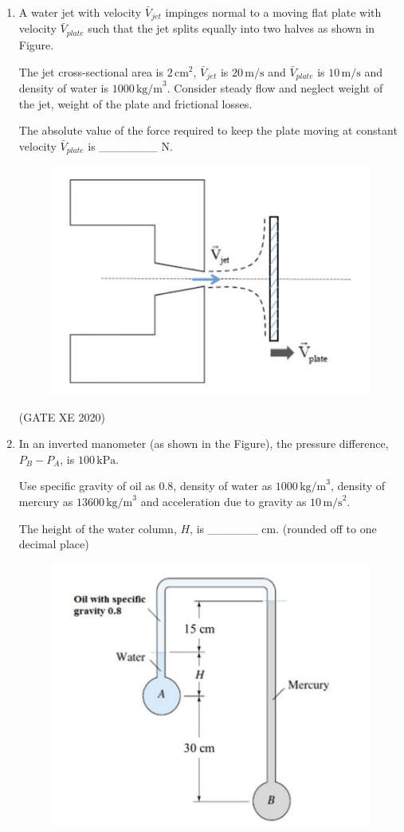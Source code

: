 \documentclass[12pt]{article}
\begin{document}
\begin{enumerate}
\item A water jet with velocity $\bar{V}_{jet}$ impinges normal to a moving flat plate with velocity $\bar{V}_{plate}$ such that the jet splits equally into two halves as shown in Figure.  

The jet cross-sectional area is $2 \,\text{cm}^2$, $\bar{V}_{jet}$ is $20 \,\text{m/s}$ and $\bar{V}_{plate}$ is $10 \,\text{m/s}$ and density of water is $1000 \,\text{kg/m}^3$. Consider steady flow and neglect weight of the jet, weight of the plate and frictional losses.  

The absolute value of the force required to keep the plate moving at constant velocity $\bar{V}_{plate}$ is \_\_\_\_\_\_\_ N.  

\begin{figure}[H]
    \centering
    \includegraphics[width=0.5\columnwidth]{figs/ass4_b_q20.png}
    \caption{}
    \label{fig:placeholder}
\end{figure}

(GATE XE 2020)

\item In an inverted manometer (as shown in the Figure), the pressure difference, 
$P_{B} - P_{A}$, is $100 \,\text{kPa}$.  

Use specific gravity of oil as $0.8$, density of water as $1000 \,\text{kg/m}^3$, density of mercury as $13600 \,\text{kg/m}^3$ and acceleration due to gravity as $10 \,\text{m/s}^2$.  

The height of the water column, $H$, is \_\_\_\_\_\_ cm. (rounded off to one decimal place)  

\begin{figure}[H]
    \centering
    \includegraphics[width=0.5\columnwidth]{figs/ass4_b_q21.png}
    \caption{}
    \label{fig:placeholder}
\end{figure}


\end{enumerate}
\end{document}
